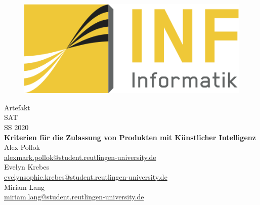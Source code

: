 \begin{titlepage}
    \begin{figure}
        \begin{flushright}
            \includegraphics[scale=0.75]{images/INFLogo.png}
        \end{flushright}
    \end{figure}

    \centering
    \vspace{1.5cm}
    {\Large Artefakt}\\

    \vspace{0.5cm}
    {\Large SAT}\\
    {\Large SS 2020}\\

    \vspace{1.0cm}
    \Large{\textbf{
            Kriterien für die Zulassung von Produkten mit Künstlicher Intelligenz
          }
    }\\

    \vspace{1.0cm}
    {\small Alex Pollok}\\
    {\small \href{mailto:alex_mark.pollok@student.reutlingen-university.de}{alex{\textunderscore}mark.pollok@student.reutlingen-university.de}}\\
    {\small Evelyn Krebes}\\
    {\small \href{mailto:evelyn_sophie.krebes@student.reutlingen-university.de}{evelyn{\textunderscore}sophie.krebes@student.reutlingen-university.de}}\\
    {\small Miriam Lang}\\
    {\small \href{mailto:miriam.lang@student.reutlingen-university.de}{miriam.lang@student.reutlingen-university.de}}\\


\end{titlepage}
